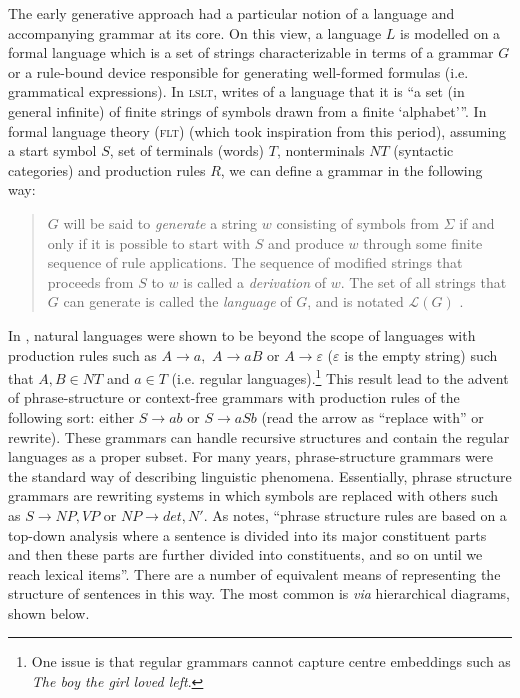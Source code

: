 \documentclass[output=paper]{langscibook}
\begin{document}
The early generative approach had a particular notion of a language and accompanying grammar at its core. On this view, a language $L$ is modelled on a formal language which is a set of strings characterizable in terms of a grammar $G$ or a rule-bound device responsible for generating well-formed formulas (i.e. grammatical expressions). In \textsc{lslt}, \cite[5]{Chomsky1975} writes of a language that it is ``a set (in general infinite) of finite strings of symbols drawn from a finite `alphabet'\thinspace''. In formal language theory (\textsc{flt}) (which took inspiration from this period), assuming a start symbol $S$, set of terminals (words) $T$, nonterminals $NT$ (syntactic categories) and production rules $R$, we can define a grammar in the following way:

\begin{quote}
$G$ will be said to \emph{generate} a string $w$ consisting of symbols from $\Sigma$ if and only if it is possible to start with $S$ and produce $w$ through some finite sequence of rule applications. The sequence of modified strings that proceeds from $S$ to $w$ is called a \emph{derivation} of $w$. The set of all strings that $G$ can generate is called the \emph{language} of $G$, and is notated $\mathcal{L}(G)$ \citep[1957]{Jager2012}. 
\end{quote}

In \cite{Chomsky1956}, natural languages were shown to be beyond the scope of languages with production rules such as $A\rightarrow a,$ $A\rightarrow aB$
or $A\rightarrow\varepsilon$ ($\varepsilon$ is the empty string)
such that $A,B\in NT$ and $a\in T$ (i.e. regular languages).\footnote{One issue is that regular grammars cannot capture centre embeddings such as \emph{The boy the girl loved left}.} This result lead to the advent of phrase-structure or context-free grammars with production rules of the following sort: either $S\rightarrow ab$ or $S\rightarrow aSb$ (read the arrow as ``replace with'' or rewrite). These grammars can handle recursive structures and contain the regular languages as a proper subset. For many years, phrase-structure grammars were the standard way of describing linguistic phenomena. Essentially, phrase structure grammars are rewriting systems in which symbols are replaced with others such as $S\rightarrow NP, VP$ or $NP\rightarrow det, N'$. As \citet[897]{Freidin2012} notes, ``phrase structure rules are based on a top-down analysis where a sentence is divided into its major constituent parts and then these parts are further divided into constituents, and so on until we reach lexical items''. There are a number of equivalent means of representing the structure of sentences in this way. The most common is \emph{via} hierarchical diagrams, shown below. 
\end{document}
